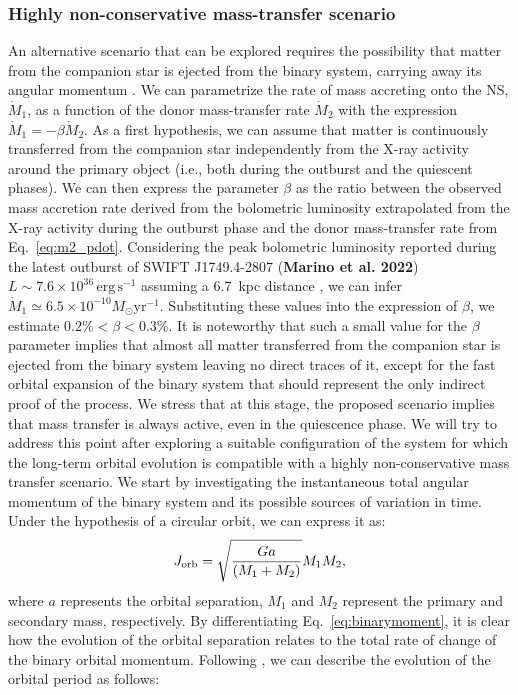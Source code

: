 \documentclass[fleqn,usenatbib]{mnras}
\newcommand{\swiftj}{SWIFT J1749.4-2807}
\begin{document}
\subsubsection*{Highly non-conservative mass-transfer scenario}
An alternative scenario that can be explored requires the possibility that matter from the companion star is ejected from the binary system, carrying away its angular momentum \citep[see e.g.,][for more details]{di-Salvo:2008uu,Burderi:2009td}. We can parametrize the rate of mass accreting onto the NS, $\dot{M}_1$, as a function of the donor mass-transfer rate $\dot{M}_2$ with the expression $\dot{M}_1=-\beta \dot{M}_2$. As a first hypothesis, we can assume that matter is continuously transferred from the companion star independently from the X-ray activity around the primary object (i.e., both during the outburst and the quiescent phases). We can then express the parameter $\beta$ as the ratio between the observed mass accretion rate derived from the bolometric luminosity extrapolated from the X-ray activity during the outburst phase and the donor mass-transfer rate from Eq.~\ref{eq:m2_pdot}. Considering the peak bolometric luminosity reported during the latest outburst of \swiftj{} (\textbf{Marino et al. 2022}) $L\sim7.6\times 10^{36}\,\text{erg}\,\text{s}^{-1}$ assuming a 6.7~kpc distance \citep{Wijnands:2009wa}, we can infer $\dot{M}_1\simeq6.5\times 10^{-10}{M}_{\odot} \text{yr}^{-1}$. Substituting these values into the expression of $\beta$, we estimate $0.2\%<\beta<0.3\%$. It is noteworthy that such a small value for the $\beta$ parameter implies that almost all matter transferred from the companion star is ejected from the binary system leaving no direct traces of it, except for the fast orbital expansion of the binary system that should represent the only indirect proof of the process. We stress that at this stage, the proposed scenario implies that mass transfer is always active, even in the quiescence phase. We will try to address this point after exploring a suitable configuration of the system  for which the long-term orbital evolution is compatible with a highly non-conservative mass transfer scenario. 
We start by investigating the instantaneous total angular momentum of the binary system and its possible sources of variation in time. Under the hypothesis of a circular orbit, we can express it as:
\begin{equation}
\label{eq:binarymoment}
J_{\rm orb}=\sqrt{\frac{Ga}{(M_1+M_2)}}M_1M_2,
\end{equation}
where $a$ represents the orbital separation, $M_1$ and $M_2$ represent the primary and secondary mass, respectively. By differentiating Eq.~\ref{eq:binarymoment}, it is clear how the evolution of the orbital separation relates to the total rate of change of the binary orbital momentum. Following \citep{di-Salvo:2008uu}, we can describe the evolution of the orbital period as follows:
\end{document}
